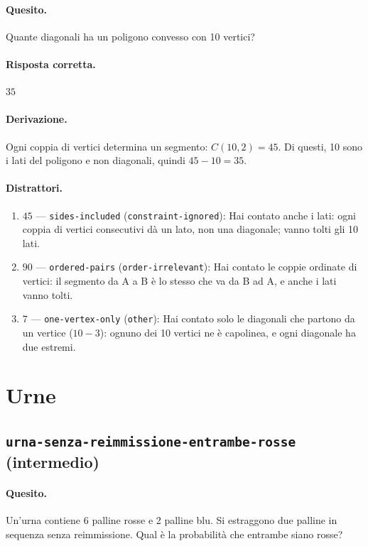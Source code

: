 \paragraph{Quesito.} Quante diagonali ha un poligono convesso con 10 vertici?

\paragraph{Risposta corretta.} $35$

\paragraph{Derivazione.} Ogni coppia di vertici determina un segmento: $C(10,2) = 45$. Di questi, 10 sono i lati del poligono e non diagonali, quindi $45 - 10 = 35$.

\paragraph{Distrattori.}
\begin{enumerate}
  \item $45$ --- \texttt{sides-included} (\texttt{constraint-ignored}): Hai contato anche i lati: ogni coppia di vertici consecutivi dà un lato, non una diagonale; vanno tolti gli 10 lati.
  \item $90$ --- \texttt{ordered-pairs} (\texttt{order-irrelevant}): Hai contato le coppie ordinate di vertici: il segmento da A a B è lo stesso che va da B ad A, e anche i lati vanno tolti.
  \item $7$ --- \texttt{one-vertex-only} (\texttt{other}): Hai contato solo le diagonali che partono da un vertice ($10 - 3$): ognuno dei 10 vertici ne è capolinea, e ogni diagonale ha due estremi.
\end{enumerate}

\section{Urne}

\subsection{\texorpdfstring{\texttt{urna-senza-reimmissione-entrambe-rosse} (intermedio)}{urna-senza-reimmissione-entrambe-rosse (intermedio)}}

\paragraph{Quesito.} Un'urna contiene 6 palline rosse e 2 palline blu. Si estraggono due palline in sequenza senza reimmissione. Qual è la probabilità che entrambe siano rosse?


